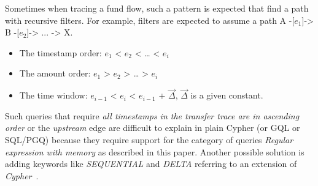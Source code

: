 
Sometimes when tracing a fund flow, such a pattern is expected that find a path
with recursive filters. For example, filters are expected to assume a path A
-[${e_1}$]-> B -[${e_2}$]-> ... -> X.

\begin{itemize}
    \item The timestamp order: ${e_1}$ < ${e_2}$ < … < ${e_i}$
    \item The amount order: ${e_1}$ > ${e_2}$ > … > ${e_i}$
    \item The time window: ${e_{i-1}}$ < ${e_i}$ < ${e_{i-1}}$ + $\vec{\Delta}$,
    $\vec{\Delta}$ is a given constant.
\end{itemize}

Such queries that require \emph{all timestamps in the transfer trace are in ascending order} or the \emph{upstream} edge are
difficult to explain in plain Cypher (or GQL or SQL/PGQ) because they require support for the category of queries
\emph{Regular expression with memory} as described in this paper\cite{10.1145/2274576.2274585}. Another possible solution is
adding keywords like \emph{SEQUENTIAL} and \emph{DELTA} referring to an extension of \emph{Cypher}~\cite{tcypher}. 


